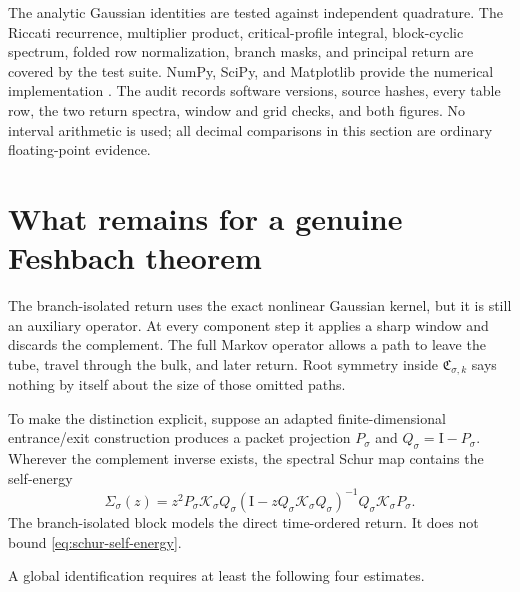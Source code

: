 \documentclass[11pt]{article}
\theoremstyle{definition}
\theoremstyle{remark}
\newcommand{\Id}{\mathrm I}
\newcommand{\cK}{\mathcal K}
\begin{document}
The analytic Gaussian identities are tested against independent quadrature.
The Riccati recurrence, multiplier product, critical-profile integral,
block-cyclic spectrum, folded row normalization, branch masks, and principal
return are covered by the test suite.  NumPy, SciPy, and Matplotlib provide
the numerical implementation
\citep{HarrisEtAl2020,VirtanenEtAl2020,Hunter2007}.  The audit records
software versions, source hashes, every table row, the two return spectra,
window and grid checks, and both figures.  No interval arithmetic is used;
all decimal comparisons in this section are ordinary floating-point
evidence.

\section{What remains for a genuine Feshbach theorem}
\label{sec:feshbach}

The branch-isolated return uses the exact nonlinear Gaussian kernel, but it
is still an auxiliary operator.  At every component step it applies a sharp
window and discards the complement.  The full Markov operator allows a path
to leave the tube, travel through the bulk, and later return.  Root symmetry
inside $\mathfrak C_{\sigma,k}$ says nothing by itself about the size of
those omitted paths.

To make the distinction explicit, suppose an adapted finite-dimensional
entrance/exit construction produces a packet projection $P_\sigma$ and
$Q_\sigma=\Id-P_\sigma$.  Wherever the complement inverse exists, the
spectral Schur map contains the self-energy
\begin{equation}\label{eq:schur-self-energy}
 \Sigma_\sigma(z)
 =z^2P_\sigma\cK_\sigma Q_\sigma
 (\Id-zQ_\sigma\cK_\sigma Q_\sigma)^{-1}
 Q_\sigma\cK_\sigma P_\sigma.
\end{equation}
The branch-isolated block models the direct time-ordered return.  It does not
bound \eqref{eq:schur-self-energy}.

A global identification requires at least the following four estimates.
\end{document}
